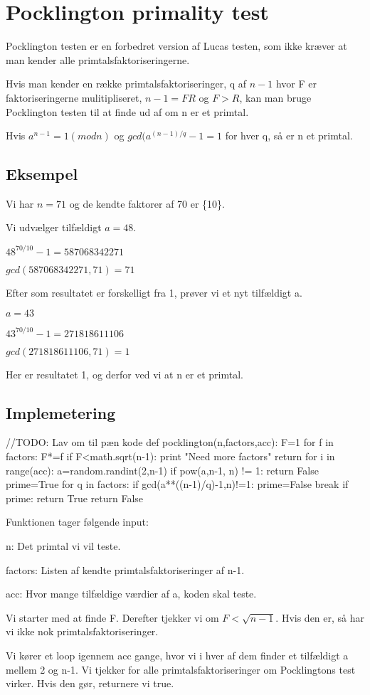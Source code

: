 \section{Pocklington primality test}
Pocklington testen er en forbedret version af Lucas testen, som ikke kræver at man kender alle primtalsfaktoriseringerne.

Hvis man kender en række primtalsfaktoriseringer, q af $n-1$ hvor F er faktoriseringerne mulitipliseret, $n-1=FR$ og $F>R$, kan man bruge Pocklington testen
til at finde ud af om n er et primtal.

Hvis $a^{n-1}=1(mod n)$ og $gcd(a^{(n-1)/q}-1=1$ for hver q, så er n et primtal.

\subsection{Eksempel}
Vi har $n=71$ og de kendte faktorer af 70 er \{10\}.

Vi udvælger tilfældigt $a=48$.

$48^{70/10}-1=587068342271$

$gcd(587068342271,71)=71$

Efter som resultatet er forskelligt fra 1, prøver vi et nyt tilfældigt a.

$a=43$

$43^{70/10}-1=271818611106$

$gcd(271818611106,71)=1$

Her er resultatet 1, og derfor ved vi at n er et primtal.

\subsection{Implemetering}
//TODO: Lav om til pæn kode
def pocklington(n,factors,acc):
	F=1
	for f in factors:
		F*=f
	if F<math.sqrt(n-1):
		print "Need more factors"
		return
	for i in range(acc):
		a=random.randint(2,n-1)
		if pow(a,n-1, n) != 1:
			return False
		prime=True
		for q in factors:
			if gcd(a**((n-1)/q)-1,n)!=1:
				prime=False
				break
		if prime:
			return True
	return False

Funktionen tager følgende input:
\begin{itemizer}
	\item n: Det primtal vi vil teste.
	\item factors: Listen af kendte primtalsfaktoriseringer af n-1.
	\item acc: Hvor mange tilfældige værdier af a, koden skal teste.
\end{itemizer}

Vi starter med at finde F. Derefter tjekker vi om $F<\sqrt{n-1}$. Hvis den er, så har vi ikke nok primtalsfaktoriseringer.

Vi kører et loop igennem acc gange, hvor vi i hver af dem finder et tilfældigt a mellem 2 og n-1. Vi tjekker for alle primtalsfaktoriseringer om Pocklingtons test virker. Hvis den gør, returnere vi true.

